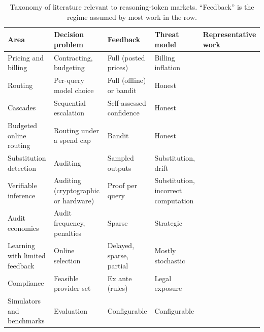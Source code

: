 \begin{table}[t]
  \caption{Taxonomy of literature relevant to reasoning-token markets. ``Feedback'' is the regime assumed by most work in the row.}
  \label{tab:taxonomy}
  \centering
  \small
  \begin{tabular}{p{}p{}p{}p{}p{}}
    \toprule
    Area & Decision problem & Feedback & Threat model & Representative work \\
    \midrule
    Pricing and billing & Contracting, budgeting & Full (posted prices) & Billing inflation & \cite{duetting2024mechanism,velasco2025overcharging,han2024tokenbudget} \\
    Routing & Per-query model choice & Full (offline) or bandit & Honest & \cite{ong2025routellm,ding2024hybrid,shnitzer2023routing,hu2024routerbench} \\
    Cascades & Sequential escalation & Self-assessed confidence & Honest & \cite{chen2023frugalgpt,yue2024cascades,aggarwal2024automix} \\
    Budgeted online routing & Routing under a spend cap & Bandit & Honest & \cite{panda2025pilot,li2026stageroute,badanidiyuru2018bwk} \\
    Substitution detection & Auditing & Sampled outputs & Substitution, drift & \cite{gao2025equality,cai2025substitution,sun2025idiosyncrasies,pasquini2025llmmap} \\
    Verifiable inference & Auditing (cryptographic or hardware) & Proof per query & Substitution, incorrect computation & \cite{sun2024zkllm,chen2024zkml,tramer2019slalom,ong2025toploc} \\
    Audit economics & Audit frequency, penalties & Sparse & Strategic & \cite{becker1968crime,border1987samurai,avenhaus2002inspection,polinsky2000enforcement} \\
    Learning with limited feedback & Online selection & Delayed, sparse, partial & Mostly stochastic & \cite{joulani2013delayed,vernade2017delayed,bartok2014partial,cesabianchi2005label} \\
    Compliance & Feasible provider set & Ex ante (rules) & Legal exposure & \cite{eu2024aiact,cac2023genai,cac2024crossborder,eu2016gdpr} \\
    Simulators and benchmarks & Evaluation & Configurable & Configurable & \cite{hu2024routerbench,zheng2022aieconomist,fish2024collusion,backlund2025vending} \\
    \bottomrule
  \end{tabular}
\end{table}


